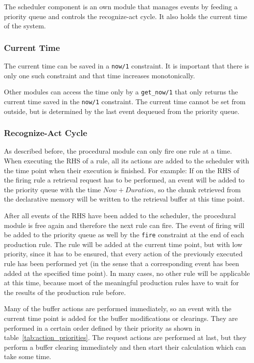 The scheduler component is an own module that manages events by feeding a priority queue and controls the recognize-act cycle. It also holds the current time of the system. 

\subsubsection{Current Time}

The current time can be saved in a \lstinline|now/1| constraint. It is important that there is only one such constraint and that time increases monotonically.

Other modules can access the time only by a \lstinline|get_now/1| that only returns the current time saved in the \lstinline|now/1| constraint. The current time cannot be set from outside, but is determined by the last event dequeued from the priority queue.

\subsubsection{Recognize-Act Cycle}

As described before, the procedural module can only fire one rule at a time. When executing the RHS of a rule, all its actions are added to the scheduler with the time point when their execution is finished. For example: If on the RHS of the firing rule a retrieval request has to be performed, an event will be added to the priority queue with the time $Now + Duration$, so the chunk retrieved from the declarative memory will be written to the retrieval buffer at this time point.

After all events of the RHS have been added to the scheduler, the procedural module is free again and therefore the next rule can fire. The event of firing will be added to the priority queue as well by the \lstinline|fire| constraint at the end of each production rule. The rule will be added at the current time point, but with low priority, since it has to be ensured, that every action of the previously executed rule has been performed yet (in the sense that a corresponding event has been added at the specified time point). In many cases, no other rule will be applicable at this time, because most of the meaningful production rules have to wait for the results of the production rule before. 

Many of the buffer actions are performed immediately, so an event with the current time point is added for the buffer modifications or clearings. They are performed in a certain order defined by their priority as shown in table~\ref{tab:action_priorities}. The request actions are performed at last, but they perform a buffer clearing immediately and then start their calculation which can take some time. 

